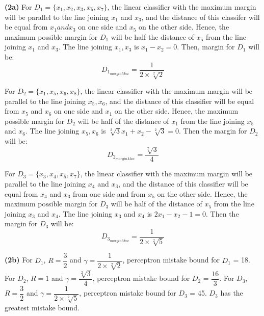 \documentclass{article}
\renewcommand\part[1]{\vspace{.10in}\textbf{(#1)}}
\begin{document}
  \part{2a} For $D_1 = \{x_1, x_2, x_3, x_5, x_7\}$, the linear classifier with the maximum margin will be parallel to the line joining $x_1$ and $x_3$, and the distance of this classifer will be equal from $x_1 and x_3$ on one side and $x_5$ on the other side.  Hence, the maximum possible margin for $D_1$ will be half the distance of $x_5$ from the line joining $x_1$ and $x_3$. The line joining $x_1,x_3$ is $x_1 - x_2 = 0$. Then, margin for $D_1$ will be: \newline
  \[D_{1_{marginMax}} = \dfrac{1}{2 \times \sqrt[2]{2}}\]
 
    For $D_2 = \{ x_1, x_5, x_6, x_8\}$, the linear classifier with the maximum margin will be parallel to the line joining $x_5, x_6$, and the distance of this classifier will be equal from $x_5$ and $x_6$ on one side and $x_1$ on the other side. Hence, the maximum possible margin for $D_2$ will be half of the distance of $x_1$ from the line joining $x_5$ and $x_6$. The line joining $x_5, x_6$ is $\sqrt[2]{3}x_1 + x_2 - \sqrt[2]{3} = 0$. Then the margin for $D_2$ will be: \newline
    \[D_{2_{marginMax}} = \dfrac{\sqrt[2]{3}}{4} \]

    For $D_3 = \{ x_3, x_4, x_5, x_7 \}$, the linear classifier with the maximum margin will be parallel to the line joining $x_4$ and $x_3$, and the distance of this classifier will be equal from $x_4$ and $x_3$ from one side and from $x_5$ on the other side. Hence, the maximum possible margin for $D_3$ will be half of the distance of $x_5$ from the line joining $x_3$ and $x_4$. The line joining $x_3$ and $x_4$ is $2x_1 - x_2 - 1 = 0$. Then the margin for $D_3$ will be: \newline
    \[ D_{3_{marginMax}} = \dfrac{1}{2\times \sqrt[2]{5}}\]

    \part{2b}
    For $D_1$, $R=\dfrac{3}{2}$ and $\gamma = \dfrac{1}{2 \times \sqrt[2]{2}}$, perceptron mistake bound for $D_1$ = 18. \newline
    For $D_2$, $R=1$ and $\gamma=\dfrac{\sqrt[2]{3}}{4}$, perceptron mistake bound for $D_2$ = $\dfrac{16}{3}$. \newline
    For $D_3$, $R=\dfrac{3}{2}$ and $\gamma = \dfrac{1}{2\times \sqrt[2]{5}}$, perceptron mistake bound for $D_3$ = 45. \newline
    $D_3$ has the greatest mistake bound. \newline
\end{document}
